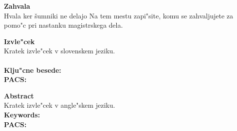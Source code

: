 
\cleardoublepage
\mbox{}
\vfill
{\Large \bf Zahvala}
\vspace{1cm}\\
Hvala ker šumniki ne delajo
Na tem mestu zapi"site, komu se zahvaljujete za pomo"c pri nastanku magistrskega dela.


\cleardoublepage
{\Large \bf Izvle"cek}
\vspace{1cm}\\
Kratek izvle"cek v slovenskem jeziku.\\
\vspace{1cm}\\
{\bf Klju"cne besede:}\\
{\bf PACS:}


\cleardoublepage
{\Large \bf Abstract}
\vspace{1cm}\\
Kratek izvle"cek v angle"skem jeziku.
\vspace{1cm}\\
{\bf Keywords:}\\
{\bf PACS:}


\tableofcontents





\cleardoublepage


\pagestyle{fancy}
\fancyhead[CE,RE]{}
\fancyhead[LO,CO]{}
\fancyhead[LE]{\textbf{\nouppercase{\leftmark}}}
\fancyhead[RO]{\textbf{\nouppercase{\rightmark}}}






% 
